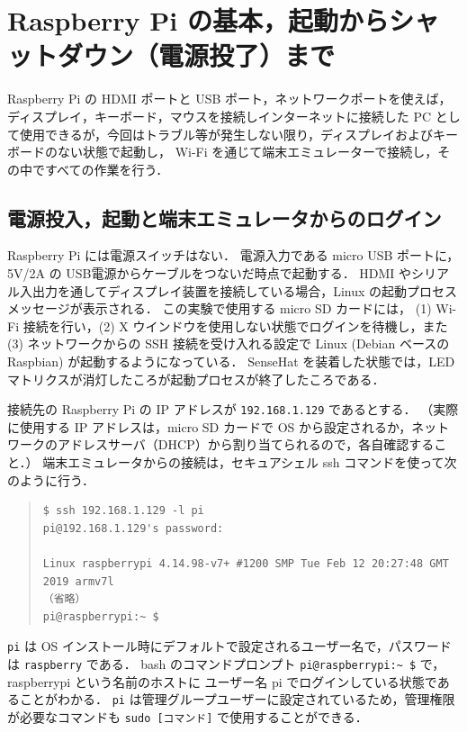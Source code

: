 \documentclass[11pt,a4,epsf]{report}
\begin{document}
\section{Raspberry Pi の基本，起動からシャットダウン（電源投了）まで}

Raspberry Pi の HDMI ポートと USB ポート，ネットワークポートを使えば，ディスプレイ，キーボード，マウスを接続しインターネットに接続した PC として使用できるが，今回はトラブル等が発生しない限り，ディスプレイおよびキーボードのない状態で起動し，
Wi-Fi を通じて端末エミュレーターで接続し，その中ですべての作業を行う．

\subsection{電源投入，起動と端末エミュレータからのログイン}

Raspberry Pi には電源スイッチはない．
電源入力である micro USB ポートに，5V/2A の USB電源からケーブルをつないだ時点で起動する．
HDMI やシリアル入出力を通してディスプレイ装置を接続している場合，Linux の起動プロセスメッセージが表示される．
この実験で使用する micro SD カードには， (1)  Wi-Fi 接続を行い，(2) X ウインドウを使用しない状態でログインを待機し，また (3) ネットワークからの SSH 接続を受け入れる設定で Linux (Debian ベースの Raspbian) が起動するようになっている．
SenseHat を装着した状態では，LED マトリクスが消灯したころが起動プロセスが終了したころである．

接続先の Raspberry Pi の IP アドレスが \verb+192.168.1.129+ であるとする．
（実際に使用する IP アドレスは，micro SD カードで OS から設定されるか，ネットワークのアドレスサーバ（DHCP）から割り当てられるので，各自確認すること．）
端末エミュレータからの接続は，セキュアシェル ssh コマンドを使って次のように行う．
\begin{quote}
\small
\begin{verbatim}
$ ssh 192.168.1.129 -l pi
pi@192.168.1.129's password: 

Linux raspberrypi 4.14.98-v7+ #1200 SMP Tue Feb 12 20:27:48 GMT 2019 armv7l
（省略）
pi@raspberrypi:~ $ 
\end{verbatim}
\end{quote}
\verb+pi+ は OS インストール時にデフォルトで設定されるユーザー名で，パスワードは \verb+raspberry+ である．
bash のコマンドプロンプト \verb+pi@raspberrypi:~ $+ で，raspberrypi という名前のホストに ユーザー名 pi でログインしている状態であることがわかる．
\verb+pi+ は管理グループユーザーに設定されているため，管理権限が必要なコマンドも \verb+sudo [コマンド]+ で使用することができる．
\end{document}

